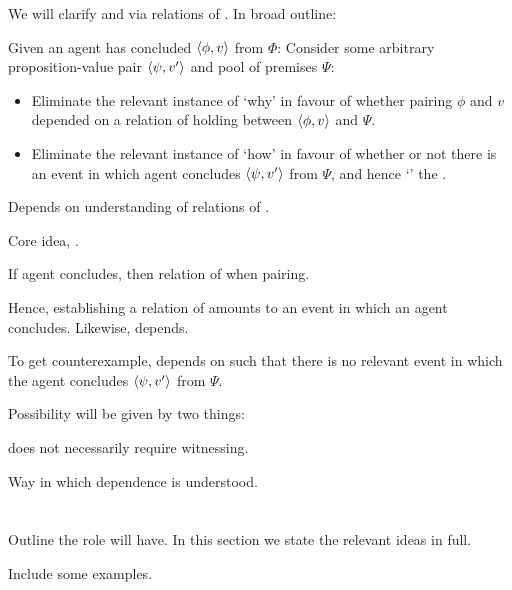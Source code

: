 \begin{note}
  We will clarify \qWhy{} and \qHow{} via relations of \support{}.
  In broad outline:


  Given an agent has concluded \(\langle \phi, v \rangle\) from \(\Phi\):
  Consider some arbitrary proposition-value pair \(\langle \psi, v' \rangle\) and pool of premises \(\Psi\):
  \begin{itemize}
  \item
    Eliminate the relevant instance of `why' in favour of whether pairing \(\phi\) and \(v\) depended on a relation of \support{} holding between \(\langle \phi, v \rangle\) and \(\Psi\).
  \item
    Eliminate the relevant instance of `how' in favour of whether or not there is an event in which agent concludes \(\langle \psi, v' \rangle\) from \(\Psi\), and hence `' the \ros{}.
  \end{itemize}

  Depends on understanding of relations of \support{}.

  Core idea, \ros{}.

  If agent concludes, then relation of \support{} when pairing.

  Hence, establishing a relation of \support{} amounts to an event in which an agent concludes.
  Likewise, depends.

  To get counterexample, depends on \ros{} such that there is no relevant event in which the agent concludes \(\langle \psi, v' \rangle\) from \(\Psi\).

  Possibility will be given by two things:

  \ros{} does not necessarily require witnessing.

  Way in which dependence is understood.
\end{note}


\section{}
\label{sec:support2}

\begin{note}
  Outline the role  will have.
  In this section we state the relevant ideas in full.
\end{note}

{
  \color{red} Include some examples.
}

\paragraph{\supportI{}}

